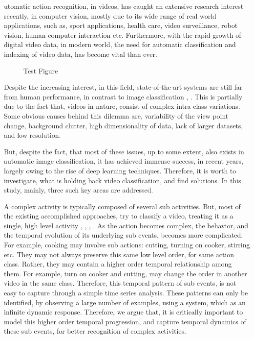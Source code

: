 utomatic action recognition, in videos, has caught an extensive research interest recently,
in computer vision, mostly due to its wide range of real world applications, such as,
sport applications, health care, video surveillance, robot vision, human-computer interaction
etc. Furthermore, with the rapid growth of digital video data, in modern world,
the need for automatic
classification and indexing of video data, has become vital than ever.






\begin{figure}
  \centering
  
  \caption{Test Figure}\label{fi:test1}
\end{figure}



Despite the increasing interest, in this field, state-of-the-art
systems are still far from human performance, in contrast to image classification \cite{girshick2014rich},
 \cite{krizhevsky2012imagenet}. This is
partially due to the fact that, videos in nature, consist of complex intra-class variations. Some
obvious causes behind this dilemma are, variability of the view point change, background
clutter, high dimensionality of data, lack of larger datasets, and low resolution.

But, despite the fact, that most of these issues, up to some extent, also exists in
automatic image classification, it has achieved immense success, in recent years,
largely owing to the rise of deep learning techniques. Therefore, it is worth to investigate,
what is holding back video classification, and find solutions. In this study, mainly, three such key
areas are addressed.

A complex activity is typically composed of several sub activities.
But, most of the existing accomplished approaches, try to classify a video, treating it as a
single, high level activity \cite{wang2011action}, \cite{wang2013action}, \cite{simonyan2014two},
\cite{7486474}.
As the action becomes complex, the behavior, and the
temporal evolution of its underlying sub events, becomes more complicated. For example,
cooking may involve sub actions: cutting, turning on cooker, stirring etc. They may not always preserve this
same low level order, for same action class. Rather, they may contain
a higher order temporal relationship among them. For example, turn on cooker and cutting,
may change the order in another video in the same class.
Therefore, this temporal pattern of sub events, is not easy to capture through a simple
time series analysis. These patterns can only be identified, by observing a large number
of examples, using a system, which as an infinite dynamic response. Therefore, we argue that, it is critically important to
model this higher order temporal
progression, and capture temporal dynamics of these sub events, for better recognition of
complex activities.

